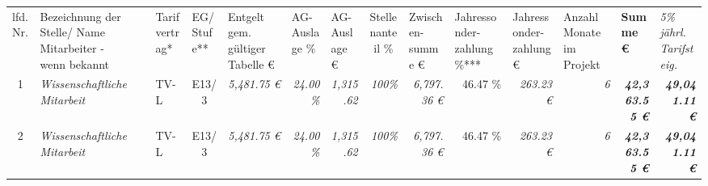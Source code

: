 \begin{table}[]
\begin{tabular}{clllcrrrrrrrrrr}
\multicolumn{1}{l}{lfd. Nr.}                                                            & Bezeichnung der Stelle/ Name Mitarbeiter - wenn bekannt &                             & Tarifvertrag*                     & \multicolumn{1}{l}{EG/ Stufe**}              & \multicolumn{1}{l}{Entgelt gem. gültiger Tabelle €} & \multicolumn{1}{l}{AG-Auslage \%}                     & \multicolumn{1}{l}{AG-Auslage €}             & \multicolumn{1}{c}{Stellenanteil \%}                    & \multicolumn{1}{l}{Zwischen-summe €}         & \multicolumn{1}{l}{Jahressonder-zahlung \%***} & \multicolumn{1}{l}{Jahressonder-zahlung €}   & \multicolumn{1}{l}{Anzahl Monate im Projekt} & \multicolumn{1}{l}{\textbf{Summe €}}                            & \multicolumn{1}{l}{\textit{5\% jährl. Tarifsteig.}}                                           \\
1                                                                                       & \multicolumn{2}{l}{\cellcolor[HTML]{FFFF99}\textit{Wissenschaftliche Mitarbeit}}      & \cellcolor[HTML]{FFFF99}TV-L      & \cellcolor[HTML]{FFFF99}E13/3                & \cellcolor[HTML]{FFFF99}\textit{5,481.75 €}         & \textit{24.00\%}                                      & \textit{1,315.62}                            & \cellcolor[HTML]{FFFF99}\textit{100\%}                  & \cellcolor[HTML]{92D050}\textit{6,797.36 €}  & 46.47 \%                                       & \cellcolor[HTML]{92D050}\textit{263.23 €}    & \cellcolor[HTML]{FFFF99}\textit{6}           & \cellcolor[HTML]{BFBFBF}\textit{\textbf{42,363.55 €}}           & \textit{\textbf{49,041.11 €}}                                                                 \\
2                                                                                       & \multicolumn{2}{l}{\cellcolor[HTML]{FFFF99}\textit{Wissenschaftliche Mitarbeit}}      & \cellcolor[HTML]{FFFF99}TV-L      & \cellcolor[HTML]{FFFF99}E13/3                & \cellcolor[HTML]{FFFF99}\textit{5,481.75 €}         & \textit{24.00\%}                                      & \textit{1,315.62}                            & \cellcolor[HTML]{FFFF99}\textit{100\%}                  & \cellcolor[HTML]{92D050}\textit{6,797.36 €}  & 46.47 \%                                       & \cellcolor[HTML]{92D050}\textit{263.23 €}    & \cellcolor[HTML]{FFFF99}\textit{6}           & \cellcolor[HTML]{BFBFBF}\textit{\textbf{42,363.55 €}}           & \textit{\textbf{49,041.11 €}}                                                                 \\

\end{tabular}
\end{table}
